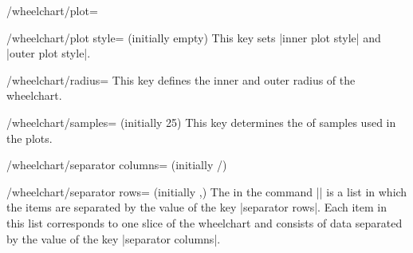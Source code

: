\documentclass[a4paper,english,dvipsnames]{ltxdoc}
\begin{document}
\begin{key}{/wheelchart/plot=}
\begin{codeexample}[width=10cm]
\begin{tikzpicture}
]{\exampleforthismanual}
\end{tikzpicture}
\end{codeexample}
\begin{codeexample}[]
\end{codeexample}
\end{key}
\begin{stylekey}{/wheelchart/plot style= (initially \normalfont empty)}
This key sets |inner plot style| and |outer plot style|.
\end{stylekey}
\begin{key}{/wheelchart/radius=}
This key defines the inner and outer radius of the wheelchart.
\begin{codeexample}[width=10cm]
\end{codeexample}
\end{key}
\begin{key}{/wheelchart/samples= (initially 25)}
This key determines the  of samples used in the plots.
\end{key}
\begin{key}{/wheelchart/separator columns= (initially /)}
\end{key}
\begin{key}{/wheelchart/separator rows= (initially ,)}
The  in the command |\wheelchart| is a list in which the items are separated by the value of the key |separator rows|. Each item in this list corresponds to one slice of the wheelchart and consists of data separated by the value of the key |separator columns|.
\end{key}
\end{document}
